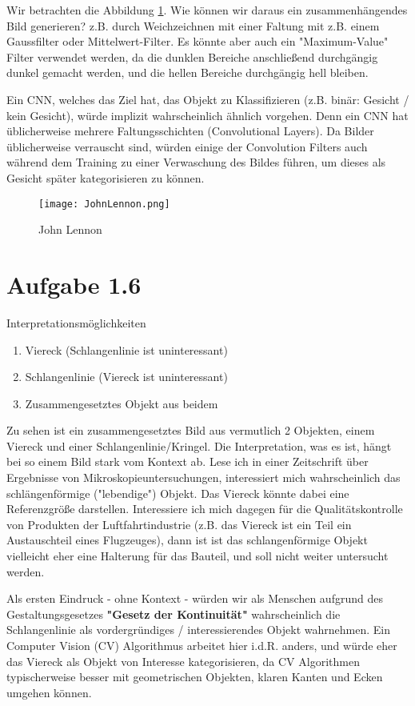 \documentclass{article}
\begin{document}
Wir betrachten die Abbildung \ref{fig:fig4}. Wie können wir daraus ein zusammenhängendes Bild generieren?
z.B. durch Weichzeichnen mit einer Faltung mit z.B. einem Gaussfilter oder Mittelwert-Filter. Es könnte aber auch ein "Maximum-Value" Filter verwendet werden, da die dunklen Bereiche anschließend durchgängig dunkel gemacht werden, und die hellen Bereiche durchgängig hell bleiben.

Ein CNN, welches das Ziel hat, das Objekt zu Klassifizieren (z.B. binär: Gesicht / kein Gesicht), würde implizit wahrscheinlich ähnlich vorgehen. Denn ein CNN hat üblicherweise mehrere Faltungsschichten (Convolutional Layers). Da Bilder üblicherweise verrauscht sind, würden einige der Convolution Filters  auch während dem Training zu einer Verwaschung des Bildes führen, um dieses als Gesicht später kategorisieren zu können.

\begin{figure}
    \centering
    \texttt{[image: JohnLennon.png]}
    \caption{John Lennon}
    \label{fig:fig4}
\end{figure}

\section*{Aufgabe 1.6}

Interpretationsmöglichkeiten
\begin{enumerate}
\item Viereck (Schlangenlinie ist uninteressant)
\item Schlangenlinie (Viereck ist uninteressant)
\item Zusammengesetztes Objekt aus beidem
\end{enumerate}

Zu sehen ist ein zusammengesetztes Bild aus vermutlich 2 Objekten, einem Viereck und einer Schlangenlinie/Kringel. Die Interpretation, was es ist, hängt bei so einem Bild stark vom Kontext ab. Lese ich in einer Zeitschrift über Ergebnisse von Mikroskopieuntersuchungen, interessiert mich wahrscheinlich das schlängenförmige ("lebendige") Objekt. Das Viereck könnte dabei eine Referenzgröße darstellen. Interessiere ich mich dagegen für die Qualitätskontrolle von Produkten der Luftfahrtindustrie (z.B. das Viereck ist ein Teil ein Austauschteil eines Flugzeuges), dann ist ist das schlangenförmige Objekt vielleicht eher eine Halterung für das Bauteil, und soll nicht weiter untersucht werden.

Als ersten Eindruck - ohne Kontext - würden wir als Menschen aufgrund des Gestaltungsgesetzes \textbf{"Gesetz der Kontinuität"} wahrscheinlich die Schlangenlinie als vordergründiges / interessierendes Objekt wahrnehmen. Ein Computer Vision (CV) Algorithmus arbeitet hier i.d.R. anders, und würde eher das Viereck als Objekt von Interesse kategorisieren, da CV Algorithmen typischerweise besser mit geometrischen Objekten, klaren Kanten und Ecken umgehen können.
\end{document}
